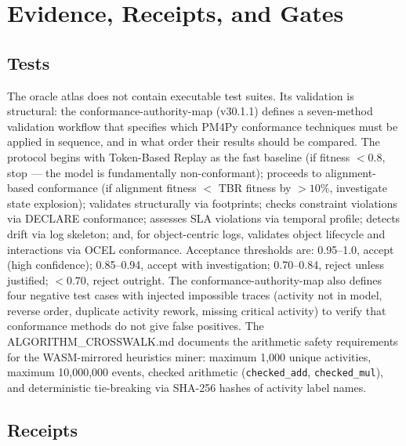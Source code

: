 
\section{Evidence, Receipts, and Gates}
\label{sec:sources-pm4py-evidence}

\subsection{Tests}
\label{sec:sources-pm4py-evidence-tests}

The oracle atlas does not contain executable test suites. Its validation is structural:
the conformance-authority-map (v30.1.1) defines a seven-method validation workflow that
specifies which PM4Py conformance techniques must be applied in sequence, and in what
order their results should be compared. The protocol begins with Token-Based Replay as
the fast baseline (if fitness $< 0.8$, stop --- the model is fundamentally non-conformant);
proceeds to alignment-based conformance (if alignment fitness $< $ TBR fitness by $> 10\%$,
investigate state explosion); validates structurally via footprints; checks constraint
violations via DECLARE conformance; assesses SLA violations via temporal profile; detects
drift via log skeleton; and, for object-centric logs, validates object lifecycle and
interactions via OCEL conformance. Acceptance thresholds are: 0.95--1.0, accept
(high confidence); 0.85--0.94, accept with investigation; 0.70--0.84, reject unless
justified; $<0.70$, reject outright. The conformance-authority-map also defines four
negative test cases with injected impossible traces (activity not in model, reverse order,
duplicate activity rework, missing critical activity) to verify that conformance methods
do not give false positives. The ALGORITHM\_CROSSWALK.md documents the arithmetic safety
requirements for the WASM-mirrored heuristics miner: maximum 1,000 unique activities,
maximum 10,000,000 events, checked arithmetic (\texttt{checked\_add}, \texttt{checked\_mul}),
and deterministic tie-breaking via SHA-256 hashes of activity label names.

\subsection{Receipts}
\label{sec:sources-pm4py-evidence-receipts}

